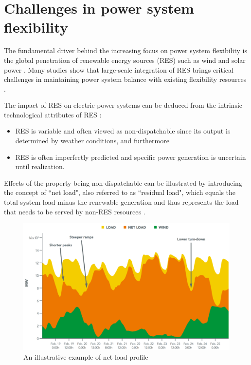 \section[Challenges in power system flexibility]{Challenges in power system flexibility%
	}
The fundamental driver behind the increasing focus on power system flexibility is the global penetration of renewable energy sources (RES) such as wind and solar power \cite{Agency2016}. Many studies show that large-scale integration of RES brings critical challenges in maintaining power system balance with existing flexibility resources \cite{Cochran2014,Wang2017,Lund2015,FraunhoferIWES2015,Muller2016,Kwon2014,Kondziella2016,Papaefthymiou2016,Alizadeh2016,Bertsch2016}. 

The impact of RES on electric power systems can be deduced from the intrinsic technological attributes of RES \cite{Kondziella2016,Edenhofer2013}:
\begin{itemize}
	\item RES is variable and often viewed as non-dispatchable since its output is determined by weather conditions, and furthermore
	\item RES is often imperfectly predicted and specific power generation is uncertain until realization.
\end{itemize}

Effects of the property being non-dispatchable can be illustrated by introducing the concept of ``net load", also referred to as ``residual load", which equals the total system load minus the renewable generation and thus represents the load that needs to be served by non-RES resources \cite{Cochran2014,Muller2016,Ueckerdt2015}.

\begin{figure}[h!]
	\centering
	\includegraphics[width=0.9\linewidth]{Figures/NetLoad}
	\caption{An illustrative example of net load profile \cite{Cochran2014}}
	\label{fig:net-load}
\end{figure}

